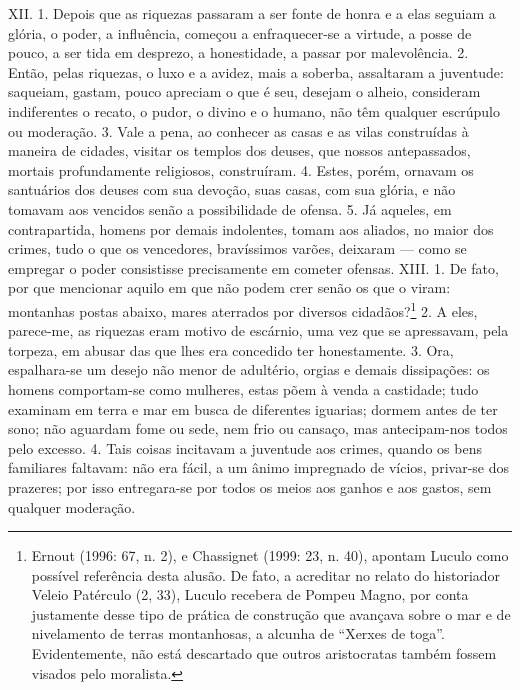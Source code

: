 XII. 1. Depois que as riquezas passaram a ser fonte de honra e a elas seguiam a
glória, o poder, a influência, começou a enfraquecer-se a virtude, a posse de
pouco, a ser tida em desprezo, a honestidade, a passar por malevolência. 2.
Então, pelas riquezas, o luxo e a avidez, mais a soberba, assaltaram a
juventude: saqueiam, gastam, pouco apreciam o que é seu, desejam o alheio,
consideram indiferentes o recato, o pudor, o divino e o humano, não têm
qualquer escrúpulo ou moderação. 3. Vale a pena, ao conhecer as casas e as
vilas construídas à maneira de cidades, visitar os templos dos deuses, que
nossos antepassados, mortais profundamente religiosos, construíram. 4. Estes,
porém, ornavam os santuários dos deuses com sua devoção, suas casas, com sua
glória, e não tomavam aos vencidos senão a possibilidade de ofensa. 5. Já
aqueles, em contrapartida, homens por demais indolentes, tomam aos aliados, no
maior dos crimes, tudo o que os vencedores, bravíssimos varões, deixaram ---
como se empregar o poder consistisse precisamente em cometer ofensas.  XIII. 1.
De fato, por que mencionar aquilo em que não podem crer senão os que o viram:
montanhas postas abaixo, mares aterrados por diversos cidadãos?\footnote{Ernout
(1996: 67, n. 2), e Chassignet (1999: 23, n. 40), apontam Luculo como
possível referência desta alusão. De fato, a acreditar no relato do historiador
Veleio Patérculo (2, 33), Luculo recebera de Pompeu Magno, por conta justamente
desse tipo de prática de construção que avançava sobre o mar e de nivelamento
de terras montanhosas, a alcunha de ``Xerxes de toga''. Evidentemente, não está
descartado que outros aristocratas também fossem visados pelo moralista.} 2. A
eles, parece-me, as riquezas eram motivo de escárnio, uma vez que se
apressavam, pela torpeza, em abusar das que lhes era concedido ter
honestamente. 3. Ora, espalhara-se um desejo não menor de adultério, orgias e
demais dissipações: os homens comportam-se como mulheres, estas põem à venda a
castidade; tudo examinam em terra e mar em busca de diferentes iguarias; dormem
antes de ter sono; não aguardam fome ou sede, nem frio ou cansaço, mas
antecipam-nos todos pelo excesso. 4. Tais coisas incitavam a juventude aos
crimes, quando os bens familiares faltavam: não era fácil, a um ânimo
impregnado de vícios, privar-se dos prazeres; por isso entregara-se por todos
os meios aos ganhos e aos gastos, sem qualquer moderação.

